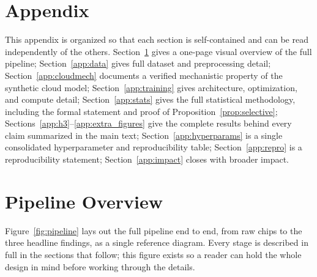 \documentclass{article}
\begin{document}



\clearpage
\appendix
\section*{Appendix}
This appendix is organized so that each section is self-contained and can be read independently of the others. Section~\ref{app:overview} gives a one-page visual overview of the full pipeline; Section~\ref{app:data} gives full dataset and preprocessing detail; Section~\ref{app:cloudmech} documents a verified mechanistic property of the synthetic cloud model; Section~\ref{app:training} gives architecture, optimization, and compute detail; Section~\ref{app:stats} gives the full statistical methodology, including the formal statement and proof of Proposition~\ref{prop:selective}; Sections~\ref{app:h3}--\ref{app:extra_figures} give the complete results behind every claim summarized in the main text; Section~\ref{app:hyperparams} is a single consolidated hyperparameter and reproducibility table; Section~\ref{app:repro} is a reproducibility statement; Section~\ref{app:impact} closes with broader impact.

\section{Pipeline Overview}
\label{app:overview}

Figure~\ref{fig:pipeline} lays out the full pipeline end to end, from raw chips to the three headline findings, as a single reference diagram. Every stage is described in full in the sections that follow; this figure exists so a reader can hold the whole design in mind before working through the details.
\end{document}
